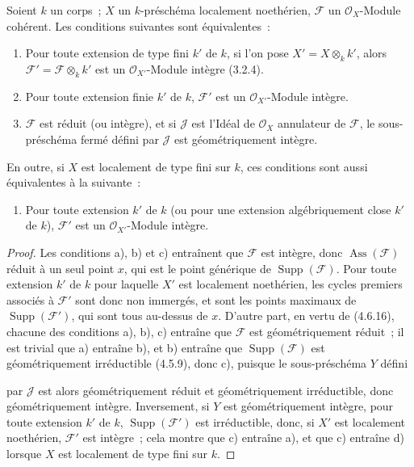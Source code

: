 \begin{proposition}[4.6.18]
\label{IV.2.4.6.18-fr}
Soient $k$ un corps~; $X$ un $k$-préschéma localement noethérien, $\mathscr F$
un $\mathcal O_X$-Module cohérent. Les conditions suivantes sont
équivalentes~:
\begin{enumerate}
\item[a)] Pour toute extension de type fini $k'$ de $k$, si l'on pose
$X'=X\otimes_k k'$, alors $\mathscr F'=\mathscr F\otimes_k k'$ est un
$\mathcal O_{X'}$-Module intègre (3.2.4).
\item[b)] Pour toute extension finie $k'$ de $k$, $\mathscr F'$ est un
$\mathcal O_{X'}$-Module intègre.
\item[c)] $\mathscr F$ est réduit (ou intègre), et si $\mathscr J$ est
l'Idéal de $\mathcal O_X$ annulateur de $\mathscr F$, le sous-préschéma fermé
défini par $\mathscr J$ est géométriquement intègre.
\end{enumerate}
En outre, si $X$ est localement de type fini sur $k$, ces conditions sont aussi
équivalentes à la suivante~:
\begin{enumerate}
\item[d)] Pour toute extension $k'$ de $k$ (ou pour une extension
algébriquement close $k'$ de $k$), $\mathscr F'$ est un
$\mathcal O_{X'}$-Module intègre.
\end{enumerate}
\end{proposition}

\begin{proof}
Les conditions a), b) et c) entraînent que $\mathscr F$ est intègre, donc
$\operatorname{Ass}(\mathscr F)$ réduit à un seul point $x$, qui est le point
générique de $\operatorname{Supp}(\mathscr F)$. Pour toute extension $k'$ de
$k$ pour laquelle $X'$ est localement noethérien, les cycles premiers associés
à $\mathscr F'$ sont donc non immergés, et sont les points maximaux de
$\operatorname{Supp}(\mathscr F')$, qui sont tous au-dessus de $x$. D'autre
part, en vertu de (4.6.16), chacune des conditions a), b), c) entraîne que
$\mathscr F$ est géométriquement réduit~; il est trivial que a) entraîne b),
et b) entraîne que $\operatorname{Supp}(\mathscr F)$ est géométriquement
irréductible (4.5.9), donc c), puisque le sous-préschéma $Y$ défini


par $\mathscr J$ est alors géométriquement réduit et géométriquement
irréductible, donc géométriquement intègre. Inversement, si $Y$ est
géométriquement intègre, pour toute extension $k'$ de $k$,
$\operatorname{Supp}(\mathscr F')$ est irréductible, donc, si $X'$ est
localement noethérien, $\mathscr F'$ est intègre~; cela montre que c) entraîne
a), et que c) entraîne d) lorsque $X$ est localement de type fini sur $k$.
\end{proof}

